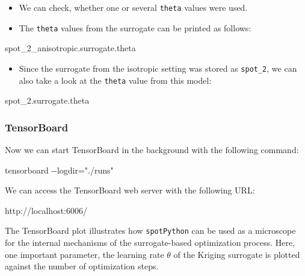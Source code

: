 \documentclass[
  letterpaper,
  DIV=11,
  numbers=noendperiod]{scrreprt}
\newenvironment{Shaded}{\begin{snugshade}}{\end{snugshade}}
\newcommand{\NormalTok}[1]{\textcolor[rgb]{0.00,0.23,0.31}{#1}}
\providecommand{\tightlist}{%
  \setlength{\itemsep}{0pt}\setlength{\parskip}{0pt}}\usepackage{longtable,booktabs,array}
\begin{document}
\begin{itemize}
\tightlist
\item
  We can check, whether one or several \texttt{theta} values were used.
\item
  The \texttt{theta} values from the surrogate can be printed as
  follows:
\end{itemize}

\begin{Shaded}
\begin{Highlighting}[]
\NormalTok{spot\_2\_anisotropic.surrogate.theta}
\end{Highlighting}
\end{Shaded}

\begin{itemize}
\tightlist
\item
  Since the surrogate from the isotropic setting was stored as
  \texttt{spot\_2}, we can also take a look at the \texttt{theta} value
  from this model:
\end{itemize}

\begin{Shaded}
\begin{Highlighting}[]
\NormalTok{spot\_2.surrogate.theta}
\end{Highlighting}
\end{Shaded}

\subsubsection{TensorBoard}\label{tensorboard-3}

Now we can start TensorBoard in the background with the following
command:

\begin{Shaded}
\begin{Highlighting}[]
\NormalTok{tensorboard {-}{-}logdir="./runs"}
\end{Highlighting}
\end{Shaded}

We can access the TensorBoard web server with the following URL:

\begin{Shaded}
\begin{Highlighting}[]
\NormalTok{http://localhost:6006/}
\end{Highlighting}
\end{Shaded}

The TensorBoard plot illustrates how \texttt{spotPython} can be used as
a microscope for the internal mechanisms of the surrogate-based
optimization process. Here, one important parameter, the learning rate
\(\theta\) of the Kriging surrogate is plotted against the number of
optimization steps.
\end{document}
